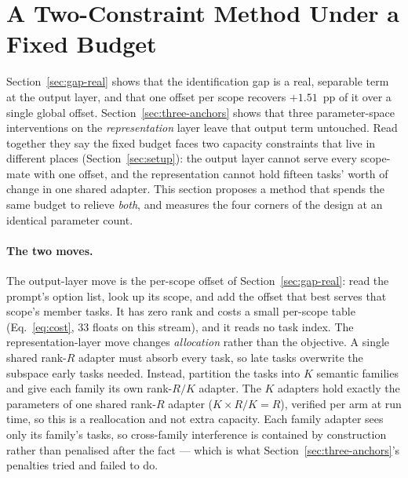 \section{A Two-Constraint Method Under a Fixed Budget}
\label{sec:method}

Section~\ref{sec:gap-real} shows that the identification gap is a real, separable
term at the output layer, and that one offset per scope recovers $+1.51$~pp of it
over a single global offset. Section~\ref{sec:three-anchors} shows that three
parameter-space interventions on the \emph{representation} layer leave that output
term untouched. Read together they say the fixed budget faces two capacity
constraints that live in different places (Section~\ref{sec:setup}): the output
layer cannot serve every scope-mate with one offset, and the representation cannot
hold fifteen tasks' worth of change in one shared adapter. This section proposes a
method that spends the same budget to relieve \emph{both}, and measures the four
corners of the design at an identical parameter count.

\paragraph{The two moves.}
The output-layer move is the per-scope offset of Section~\ref{sec:gap-real}: read
the prompt's option list, look up its scope, and add the offset that best serves
that scope's member tasks. It has zero rank and costs a small per-scope table
(Eq.~\eqref{eq:cost}, $33$ floats on this stream), and it reads no task index.
The representation-layer move changes \emph{allocation} rather than the objective.
A single shared rank-$R$ adapter must absorb every task, so late tasks overwrite
the subspace early tasks needed. Instead, partition the tasks into $K$ semantic
families and give each family its own rank-$R/K$ adapter. The $K$ adapters hold
exactly the parameters of one shared rank-$R$ adapter ($K\times R/K = R$), verified
per arm at run time, so this is a reallocation and not extra capacity. Each family
adapter sees only its family's tasks, so cross-family interference is contained by
construction rather than penalised after the fact --- which is what
Section~\ref{sec:three-anchors}'s penalties tried and failed to do.

